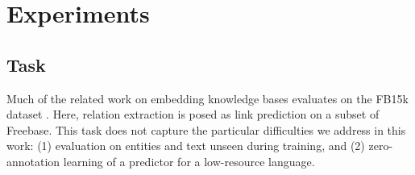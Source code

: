 






\section{Experiments}

\subsection{Task}

Much of the related work on embedding knowledge bases evaluates on the FB15k dataset \citep{transe,wang2014knowledge,lin2015learning,bishan,toutanova2015representing}. Here, relation extraction is posed as link prediction on a subset of Freebase.  This task does not capture the particular difficulties we address in this work: (1) evaluation on entities and text unseen during training, and (2) zero-annotation learning of a predictor for a low-resource language. 

